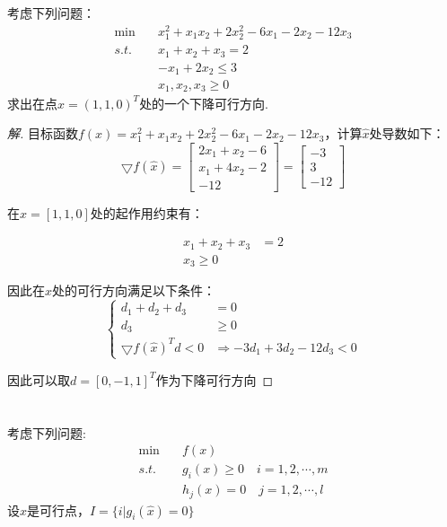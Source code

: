 \documentclass[a4paper,12pt]{article}
\begin{document}
\section{}
考虑下列问题：
\begin{equation}
\begin{aligned}
\min\quad &x_1^2+x_1x_2+2x_2^2-6x_1-2x_2-12x_3 \\
s.t.\quad &x_1+x_2+x_3=2 \\
&-x_1+2x_2\le 3\\
&x_1,x_2,x_3\ge 0
\end{aligned}
\end{equation}
求出在点$\hat{x}=(1,1,0)^T$处的一个下降可行方向.
\begin{proof}[解]
目标函数$f(x)=x_1^2+x_1x_2+2x_2^2-6x_1-2x_2-12x_3$，计算$\hat{x}$处导数如下：
\begin{equation}
\bigtriangledown f(\hat{x})=\left[
\begin{array}{c}
2x_1+x_2-6 \\
x_1+4x_2-2 \\
-12
\end{array}
\right]=\left[
\begin{array}{c}
-3 \\
3 \\
-12
\end{array}
\right]
\end{equation}

在$\hat{x}=[1,1,0]$处的起作用约束有：

\begin{equation}
\begin{aligned}
x_1+x_2+x_3&=2 \\
x_3 \ge 0
\end{aligned}
\end{equation}

因此在$\hat{x}$处的可行方向满足以下条件：
\begin{equation}
\left\{
\begin{aligned}
d_1+d_2+d_3&=0 \\
d_3&\ge 0 \\
\bigtriangledown f(\hat{x})^Td<0 &\Rightarrow -3d_1+3d_2-12d_3<0
\end{aligned}
\right.
\end{equation}

因此可以取$d=[0,-1,1]^T$作为下降可行方向
\end{proof}

\section{}
考虑下列问题:
\begin{equation}
\begin{aligned}
\min\quad &f(x) \\
s.t.\quad &g_i(x)\ge 0\quad i=1,2,\cdots,m \\
&h_j(x)=0\quad j=1,2,\cdots,l
\end{aligned}
\end{equation}
设$\hat{x}$是可行点，$I=\{i|g_i(\hat{x})=0\}$
\end{document}
